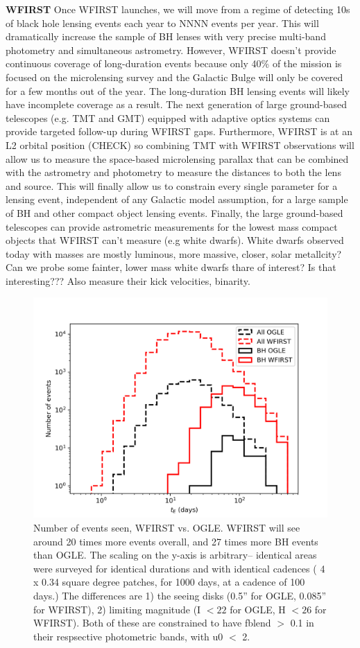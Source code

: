 \documentclass[11pt]{article}
\begin{document}
\textbf{WFIRST}
Once WFIRST launches, we will move from a regime of detecting 10s of black hole lensing events each year to NNNN events per year. This will dramatically increase the sample of BH lenses with very precise multi-band photometry and simultaneous astrometry. However, WFIRST doesn’t provide continuous coverage of long-duration events because only 40\% of the mission is focused on the microlensing survey and the Galactic Bulge will only be covered for a few months out of the year. The long-duration BH lensing events will likely have incomplete coverage as a result. The next generation of large ground-based telescopes (e.g. TMT and GMT) equipped with adaptive optics systems can provide targeted follow-up during WFIRST gaps. Furthermore, WFIRST is at an L2 orbital position (CHECK) so combining TMT with WFIRST observations will allow us to measure the space-based microlensing parallax that can be combined with the astrometry and photometry to measure the distances to both the lens and source. This will finally allow us to constrain every single parameter for a lensing event, independent of any Galactic model assumption, for a large sample of BH and other compact object lensing events.  Finally, the large ground-based telescopes can provide astrometric measurements for the lowest mass compact objects that WFIRST can’t measure (e.g white dwarfs).  White dwarfs observed today with masses are mostly luminous, more massive, closer, solar metallcity? Can we probe some fainter, lower mass white dwarfs thare of interest? Is that interesting??? 
Also measure their kick velocities, binarity.

\begin{figure}
    \centering
    \includegraphics[scale=0.5]{wfirst_v_ogle.png}
    \caption{Number of events seen, WFIRST vs. OGLE. WFIRST will see around 20 times more events overall, and 27 times more BH events than OGLE. The scaling on the y-axis is arbitrary-- identical areas were surveyed for identical durations and with identical cadences ( 4 x 0.34 square degree patches, for 1000 days, at a cadence of 100 days.) The differences are 1) the seeing disks (0.5'' for OGLE, 0.085'' for WFIRST), 2) limiting magnitude (I $< 22$ for OGLE, H $< 26$ for WFIRST). Both of these are constrained to have fblend $>$ 0.1 in their respsective photometric bands, with u0 $<$ 2.}
\end{figure}
\end{document}
